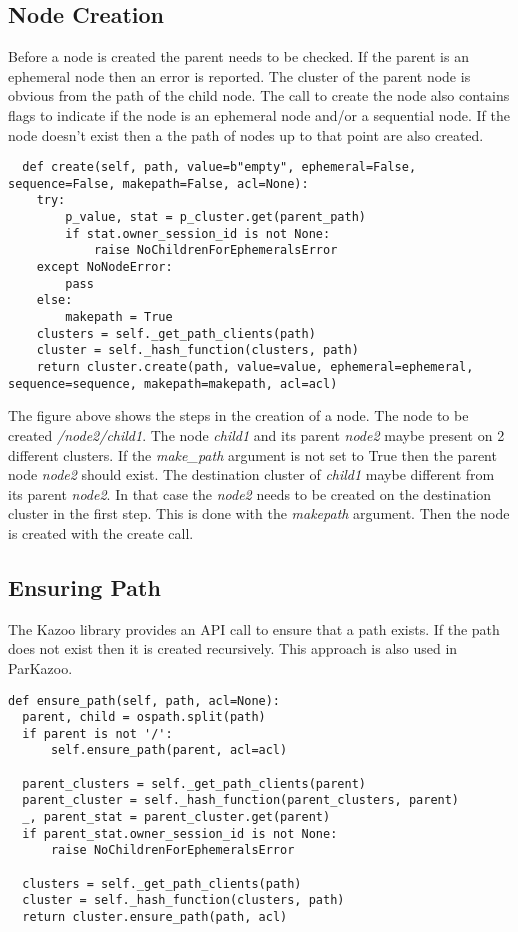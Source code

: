 

\subsection{Node Creation}
Before a node is created the parent needs to be checked. If the parent is an ephemeral node then an error is reported. The cluster of the parent node is obvious from the path of the child node. The call to create the node also contains flags to indicate if the node is an ephemeral node and/or a sequential node. If the node doesn't exist then a the path of nodes up to that point are also created.

\vspace{1.5em}


\begin{lstlisting}
  def create(self, path, value=b"empty", ephemeral=False, sequence=False, makepath=False, acl=None):
    try:
        p_value, stat = p_cluster.get(parent_path)
        if stat.owner_session_id is not None:
            raise NoChildrenForEphemeralsError
    except NoNodeError:
        pass
    else:
        makepath = True
    clusters = self._get_path_clients(path)
    cluster = self._hash_function(clusters, path)
    return cluster.create(path, value=value, ephemeral=ephemeral, sequence=sequence, makepath=makepath, acl=acl)
\end{lstlisting}

The figure above shows the steps in the creation of a node. The node to be created \textit{/node2/child1}. The node \textit{child1} and its parent \textit{node2} maybe present on 2 different clusters. If the \textit{make\_path} argument is not set to True then the parent node \textit{node2} should exist. The destination cluster of \textit{child1} maybe different from its parent \textit{node2}. In that case the \textit{node2} needs to be created on the destination cluster in the first step. This is done with the \textit{makepath} argument. Then the node is created with the create call.

\subsection{Ensuring Path}
The Kazoo library provides an API call to ensure that a path exists. If the path does not exist then it is created recursively. This approach is also used in ParKazoo.

\begin{lstlisting}
def ensure_path(self, path, acl=None):
  parent, child = ospath.split(path)
  if parent is not '/':
      self.ensure_path(parent, acl=acl)

  parent_clusters = self._get_path_clients(parent)
  parent_cluster = self._hash_function(parent_clusters, parent)
  _, parent_stat = parent_cluster.get(parent)
  if parent_stat.owner_session_id is not None:
      raise NoChildrenForEphemeralsError

  clusters = self._get_path_clients(path)
  cluster = self._hash_function(clusters, path)
  return cluster.ensure_path(path, acl)
\end{lstlisting}

